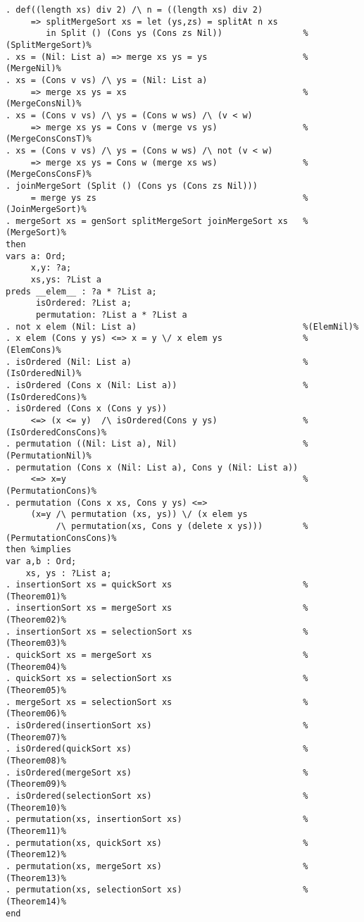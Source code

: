 \begin{Verbatim}
. def((length xs) div 2) /\ n = ((length xs) div 2) 
     => splitMergeSort xs = let (ys,zs) = splitAt n xs
        in Split () (Cons ys (Cons zs Nil))                %(SplitMergeSort)%
. xs = (Nil: List a) => merge xs ys = ys                   %(MergeNil)%
. xs = (Cons v vs) /\ ys = (Nil: List a) 
     => merge xs ys = xs                                   %(MergeConsNil)%
. xs = (Cons v vs) /\ ys = (Cons w ws) /\ (v < w)  
     => merge xs ys = Cons v (merge vs ys)                 %(MergeConsConsT)%
. xs = (Cons v vs) /\ ys = (Cons w ws) /\ not (v < w) 
     => merge xs ys = Cons w (merge xs ws)                 %(MergeConsConsF)%
. joinMergeSort (Split () (Cons ys (Cons zs Nil))) 
     = merge ys zs                                         %(JoinMergeSort)%
. mergeSort xs = genSort splitMergeSort joinMergeSort xs   %(MergeSort)%
then
vars a: Ord;
     x,y: ?a;
     xs,ys: ?List a
preds __elem__ : ?a * ?List a;
      isOrdered: ?List a;
      permutation: ?List a * ?List a
. not x elem (Nil: List a)                                 %(ElemNil)%
. x elem (Cons y ys) <=> x = y \/ x elem ys                %(ElemCons)%
. isOrdered (Nil: List a)                                  %(IsOrderedNil)%
. isOrdered (Cons x (Nil: List a))                         %(IsOrderedCons)%
. isOrdered (Cons x (Cons y ys)) 
     <=> (x <= y)  /\ isOrdered(Cons y ys)                 %(IsOrderedConsCons)%
. permutation ((Nil: List a), Nil)                         %(PermutationNil)%
. permutation (Cons x (Nil: List a), Cons y (Nil: List a))
     <=> x=y                                               %(PermutationCons)%
. permutation (Cons x xs, Cons y ys) <=>
     (x=y /\ permutation (xs, ys)) \/ (x elem ys
          /\ permutation(xs, Cons y (delete x ys)))        %(PermutationConsCons)%
then %implies
var a,b : Ord;
    xs, ys : ?List a;
. insertionSort xs = quickSort xs                          %(Theorem01)%
. insertionSort xs = mergeSort xs                          %(Theorem02)%
. insertionSort xs = selectionSort xs                      %(Theorem03)%
. quickSort xs = mergeSort xs                              %(Theorem04)%
. quickSort xs = selectionSort xs                          %(Theorem05)%
. mergeSort xs = selectionSort xs                          %(Theorem06)%
. isOrdered(insertionSort xs)                              %(Theorem07)%
. isOrdered(quickSort xs)                                  %(Theorem08)%
. isOrdered(mergeSort xs)                                  %(Theorem09)%
. isOrdered(selectionSort xs)                              %(Theorem10)%
. permutation(xs, insertionSort xs)                        %(Theorem11)%
. permutation(xs, quickSort xs)                            %(Theorem12)%
. permutation(xs, mergeSort xs)                            %(Theorem13)%
. permutation(xs, selectionSort xs)                        %(Theorem14)%
end
\end{Verbatim}
